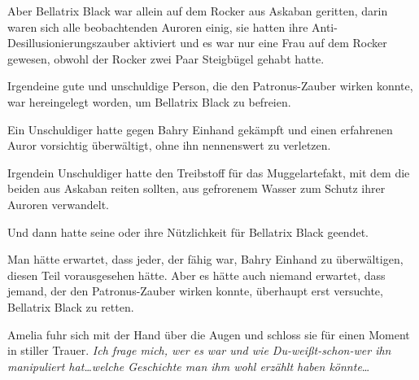 Aber Bellatrix Black war allein auf dem Rocker aus Askaban geritten, darin waren sich alle beobachtenden Auroren einig, sie hatten ihre Anti-Desillusionierungszauber aktiviert und es war nur eine Frau auf dem Rocker gewesen, obwohl der Rocker zwei Paar Steigbügel gehabt hatte.

Irgendeine gute und unschuldige Person, die den Patronus-Zauber wirken konnte, war hereingelegt worden, um Bellatrix Black zu befreien.

Ein Unschuldiger hatte gegen Bahry Einhand gekämpft und einen erfahrenen Auror vorsichtig überwältigt, ohne ihn nennenswert zu verletzen.

Irgendein Unschuldiger hatte den Treibstoff für das Muggelartefakt, mit dem die beiden aus Askaban reiten sollten, aus gefrorenem Wasser zum Schutz ihrer Auroren verwandelt.

Und dann hatte seine oder ihre Nützlichkeit für Bellatrix Black geendet.

Man hätte erwartet, dass jeder, der fähig war, Bahry Einhand zu überwältigen, diesen Teil vorausgesehen hätte. Aber es hätte auch niemand erwartet, dass jemand, der den Patronus-Zauber wirken konnte, überhaupt erst versuchte, Bellatrix Black zu retten.

Amelia fuhr sich mit der Hand über die Augen und schloss sie für einen Moment in stiller Trauer. \emph{Ich frage mich, wer es war und wie Du-weißt-schon-wer ihn manipuliert hat…welche Geschichte man ihm wohl erzählt haben könnte}…


